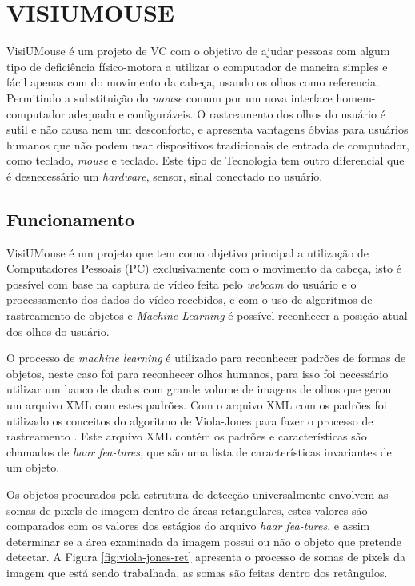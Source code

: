 \chapter{VISIUMOUSE}\label{CAP4}
VisiUMouse é um projeto de VC com o objetivo de ajudar pessoas com algum tipo de deficiência físico-motora a utilizar o computador de maneira simples e fácil apenas com do movimento da cabeça, usando os olhos como referencia. Permitindo a substituição do \textit{mouse} comum por um nova interface homem-computador adequada e configuráveis. O rastreamento dos olhos do usuário é sutil e não causa nem um desconforto, e apresenta vantagens óbvias para usuários humanos que não podem usar dispositivos tradicionais de entrada de computador, como teclado, \textit{mouse} e teclado. Este tipo de Tecnologia tem outro diferencial que é desnecessário um \textit{hardware}, sensor, sinal conectado no usuário.

\section{Funcionamento}\label{Sub:funcionamento-visiumouse}
VisiUMouse é um projeto que tem como objetivo principal a utilização de Computadores Pessoais (PC) exclusivamente com o movimento da cabeça, isto é possível com base na captura de vídeo feita pelo \textit{webcam} do usuário e o processamento dos dados do vídeo recebidos, e com o uso de algoritmos de rastreamento de objetos e \textit{Machine Learning} é possível reconhecer a posição atual dos olhos do usuário. 

O processo de \textit{machine learning} é utilizado para reconhecer padrões de formas de objetos, neste caso foi para reconhecer olhos humanos, para isso foi necessário utilizar um banco de dados com grande volume de imagens de olhos que gerou um arquivo XML com estes padrões. Com o arquivo XML com os padrões foi utilizado os conceitos do algoritmo de Viola-Jones para fazer o processo de rastreamento . Este arquivo XML contém os padrões e características são chamados de \textit{haar fea-tures}, que são uma lista de características invariantes de um objeto.

Os objetos procurados pela estrutura de detecção universalmente envolvem as somas de pixels de imagem dentro de áreas retangulares, estes valores são comparados com os valores dos estágios do arquivo \textit{haar fea-tures}, e assim determinar se a área examinada da imagem possui ou não o objeto que pretende detectar.  A Figura \ref{fig:viola-jones-ret} apresenta o processo de somas de pixels da imagem que está sendo trabalhada, as somas são feitas dentro dos retângulos. 

